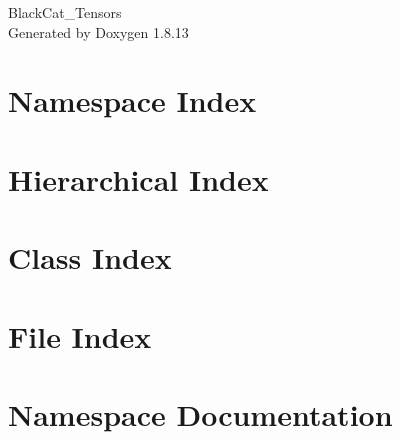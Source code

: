 \documentclass[twoside]{book}
\newcommand{\+}{\discretionary{\mbox{\scriptsize$\hookleftarrow$}}{}{}}
\newcommand{\clearemptydoublepage}{%
  \newpage{\pagestyle{empty}\cleardoublepage}%
}
\begin{document}
\hypersetup{pageanchor=false,
             bookmarksnumbered=true,
             pdfencoding=unicode
            }
\begin{titlepage}
\vspace*{7cm}
\begin{center}%
{\Large Black\+Cat\+\_\+\+Tensors }\\
\vspace*{1cm}
{\large Generated by Doxygen 1.8.13}\\
\end{center}
\end{titlepage}
\clearemptydoublepage
{}
\tableofcontents
\clearemptydoublepage
{}
\hypersetup{pageanchor=true}

\chapter{Namespace Index}

\chapter{Hierarchical Index}

\chapter{Class Index}

\chapter{File Index}

\chapter{Namespace Documentation}
































\end{document}
